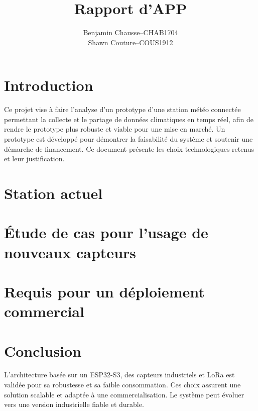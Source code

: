 \documentclass[a4paper]{article}
\title{Rapport d'APP}
\author{
  \addtolength{\tabcolsep}{-0.4em}
  \begin{tabular}{rcl}
      Benjamin Chausse & -- & CHAB1704 \\
      Shawn Couture    & -- & COUS1912 \\
  \end{tabular}
}
\makeatletter
\let\title\@title
\makeatother
\begin{document}
\maketitle
\contents{
\tableofcontents
}
\pagestyle{fancy}
\fancyhf{} %
\fancyhead[L]{\footnotesize \title}
\fancyfoot[C]{\thepage}
\renewcommand{\headrulewidth}{0.4pt} %
\renewcommand{\footrulewidth}{0pt}

\section{Introduction}
Ce projet vise à faire l'analyse d'un prototype d'une station météo connectée permettant la collecte et le partage de données climatiques 
en temps réel, afin de rendre le prototype plus robuste et viable pour une mise en marché.
Un prototype est développé pour démontrer la faisabilité du système et soutenir une démarche de financement. Ce document présente les 
choix technologiques retenus et leur justification.


\section{Station actuel}


\section{Étude de cas pour l'usage de nouveaux capteurs}


\section{Requis pour un déploiement commercial}


\section{Conclusion}
L'architecture basée sur un ESP32-S3, des capteurs industriels et 
LoRa est validée pour sa robustesse et sa faible consommation. 
Ces choix assurent une solution scalable et adaptée à une commercialisation.
Le système peut évoluer vers une version industrielle fiable et durable.

% 
\end{document}
